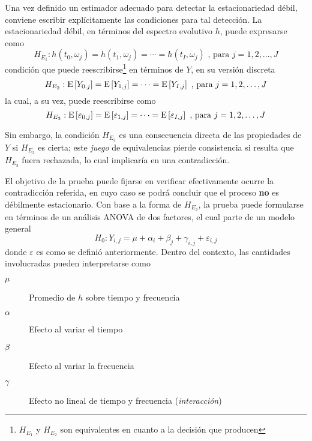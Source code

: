 
Una vez definido un estimador adecuado para detectar la estacionariedad débil, conviene escribir
explícitamente las condiciones para tal detección.
%
La estacionariedad débil, en términos del espectro evolutivo $h$, puede expresarse como
%
\begin{equation*}
H_{E_1} : h(t_0,\omega_j) = h(t_1,\omega_j) = \cdots = h(t_I,\omega_j)
\text{ , para } j = 1, 2, \dots , J
\end{equation*}
%
condición que puede reescribirse\footnote{$H_{E_1}$ y $H_{E_2}$ son equivalentes en cuanto a la
decisión que producen} en términos de $Y$, en su versión discreta
%
\begin{equation*}
H_{E_2} : \mathrm{E}\left[ Y_{0,j} \right] = \mathrm{E}\left[ Y_{1,j} \right] = \cdots = \mathrm{E}\left[ Y_{I,j} \right] \text{ , para } j = 1, 2, \dots , J
\end{equation*}
%
la cual, a su vez, puede reescribirse como
\begin{equation*}
H_{E_3} : \mathrm{E}\left[ \varepsilon_{0,j} \right] = \mathrm{E}\left[ \varepsilon_{1,j} \right] = \cdots =
\mathrm{E}\left[ \varepsilon_{I,j} \right] \text{ , para } j = 1, 2, \dots , J
\end{equation*}

Sin embargo, la condición $H_{E_3}$ es una consecuencia directa de las propiedades de $Y$ si
$H_{E_2}$ es cierta; este \textit{juego} de equivalencias pierde consistencia si resulta que
$H_{E_3}$ fuera rechazada, lo cual implicaría en una contradicción.

El objetivo de la prueba puede fijarse en verificar efectivamente ocurre la contradicción
referida, en cuyo caso se podrá concluir que el proceso \textbf{no} es débilmente estacionario.
%
Con base a la forma de $H_{E_2}$, la prueba puede formularse en términos de un análisis ANOVA de dos
factores, el cual parte de un modelo general
%
\begin{equation*}
H_0 : Y_{i,j} = \mu + \alpha_i + \beta_j + \gamma_{i,j} + \varepsilon_{i,j}
\end{equation*}
%
donde $\varepsilon$ es como se definió anteriormente. 
%
Dentro del contexto, las cantidades involucradas pueden interpretarse como
\begin{description}
\item[$\mu$] Promedio de $h$ sobre tiempo y frecuencia
\item[$\alpha$] Efecto al variar el tiempo
\item[$\beta$] Efecto al variar la frecuencia
\item[$\gamma$] Efecto no lineal de tiempo y frecuencia (\textit{interacción})
\end{description}

